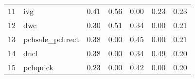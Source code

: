 \documentclass[12pt]{article}
\begin{document}
\begin{footnotesize}
\begin{longtable}{rl|c|c|c|c|c}
				11                   & ivg                         & 0.41                             & 0.56                                                                                          & 0.00                                                                                          & 0.23                                                                                          & 0.23                                                                                                   \\
				12                   & dwc                         & 0.30                             & 0.51                                                                                          & 0.34                                                                                          & 0.00                                                                                          & 0.21                                                                                                   \\
				13                   & pchsale\_pchrect            & 0.38                             & 0.00                                                                                          & 0.45                                                                                          & 0.00                                                                                          & 0.21                                                                                                   \\
				14                   & dncl                        & 0.38                             & 0.00                                                                                          & 0.34                                                                                          & 0.49                                                                                          & 0.20                                                                                                   \\
				15                   & pchquick                    & 0.23                             & 0.00                                                                                          & 0.42                                                                                          & 0.00                                                                                          & 0.20                                                                                                   \\

\end{longtable}
\end{footnotesize}
\end{document}
